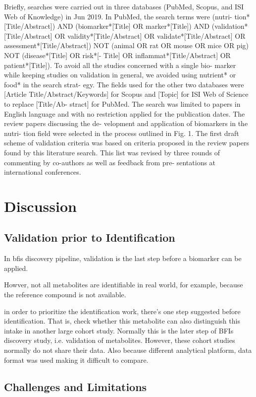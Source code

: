  Briefly, searches were carried out in three databases (PubMed, Scopus, and ISI Web of Knowledge) in Jun 2019. In PubMed, the search terms were (nutri- tion*[Title/Abstract]) AND (biomarker*[Title] OR marker*[Title]) AND (validation*[Title/Abstract] OR validity*[Title/Abstract] OR validate*[Title/Abstract] OR assessment*[Title/Abstract]) NOT (animal OR rat OR mouse OR mice OR pig) NOT (disease*[Title] OR risk*[- Title] OR inflammat*[Title/Abstract] OR patient*[Title]). To avoid all the studies concerned with a single bio- marker while keeping studies on validation in general, we avoided using nutrient* or food* in the search strat- egy. The fields used for the other two databases were [Article Title/Abstract/Keywords] for Scopus and [Topic] for ISI Web of Science to replace [Title/Ab- stract] for PubMed. The search was limited to papers in English language and with no restriction applied for the publication dates. The review papers discussing the de- velopment and application of biomarkers in the nutri- tion field were selected in the process outlined in Fig. 1. The first draft scheme of validation criteria was based on criteria proposed in the review papers found by this literature search. This list was revised by three rounds of commenting by co-authors as well as feedback from pre- sentations at international conferences.


\section{Discussion}
\subsection{Validation prior to Identification}
In \acrshort{bfis} discovery pipeline, validation is the last step before a biomarker can be applied. 

Howver, not all metabolites are identifiable in real world, for example, because the reference compound is not available.

in order to prioritize the identification work, there's one step suggested before identification.
That is, check whether this metabolite can also distinguish this intake in another large cohort study. Normally this is the later step of BFIs discovery study, i.e. validation of metabolites. 
However, these cohort studies normally do not share their data. Also because different analytical platform, data format was used making it difficult to compare.

\subsection{Challenges and Limitations}
